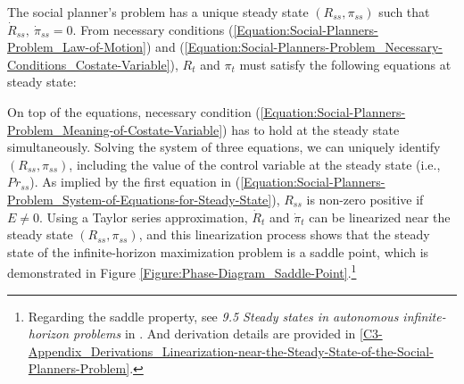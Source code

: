 The social planner's problem has a unique steady state $(R_{ss}, \pi_{ss})$ such that $\dot{R}_{ss}, \ \dot{\pi}_{ss} = 0$. From necessary conditions (\ref{Equation:Social-Planners-Problem_Law-of-Motion}) and (\ref{Equation:Social-Planners-Problem_Necessary-Conditions_Costate-Variable}), $R_{t}$ and $\pi_{t}$ must satisfy the following equations at steady state:

On top of the equations, necessary condition (\ref{Equation:Social-Planners-Problem_Meaning-of-Costate-Variable}) has to hold at the steady state simultaneously. Solving the system of three equations, we can uniquely identify $(R_{ss}, \pi_{ss})$, including the value of the control variable at the steady state (i.e., $Pr_{ss}$). As implied by the first equation in (\ref{Equation:Social-Planners-Problem_System-of-Equations-for-Steady-State}), $R_{ss}$ is non-zero positive if $E \neq 0$. Using a Taylor series approximation, $\dot{R}_{t}$ and $\dot{\pi}_{t}$ can be linearized near the steady state $(R_{ss}, \pi_{ss})$, and this linearization process shows that the steady state of the infinite-horizon maximization problem is a saddle point, which is demonstrated in Figure \ref{Figure:Phase-Diagram_Saddle-Point}.\footnote{Regarding the saddle property, see \textit{9.5 Steady states in autonomous infinite-horizon problems} in \cite{Optimal-Control-Theory-and-Static-Optimization-in-Economics_Leonard-and-Long_1992}. And derivation details are provided in \ref{C3-Appendix_Derivations_Linearization-near-the-Steady-State-of-the-Social-Planners-Problem}.}
